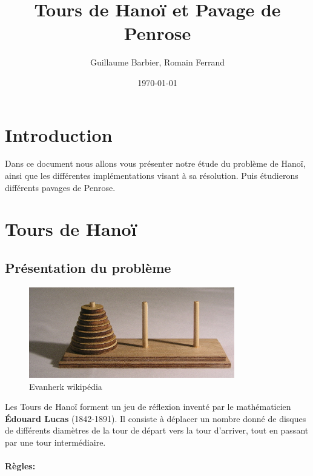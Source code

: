 \documentclass[a4paper,11pt]{article}
\begin{document}
\begin{titlepage}
  \title{Tours de Hanoï et Pavage de Penrose}
  \author{Guillaume Barbier, Romain Ferrand}
  \date{\today}

  \maketitle

  \begin{abstract}
    
  \end{abstract}
\end{titlepage}

\section*{Introduction}
Dans ce document nous allons vous présenter notre étude du problème de Hanoï,
ainsi que les différentes implémentations visant à sa résolution.
Puis étudierons différents pavages de Penrose.

\section{Tours de Hanoï}
\label{chap:hanoi}

\subsection{Présentation du problème}
\label{sec:prezHanoi}
\begin{figure}
  \centering
  \includegraphics[width=0.8\textwidth]{Tower_of_Hanoi.jpeg}
  \caption{Evanherk wikipédia}
  \label{fig:hanoi}
\end{figure}

Les Tours de Hanoï forment un jeu de réflexion inventé par le mathématicien \textbf{Édouard Lucas} (1842-1891).
Il consiste à déplacer un nombre donné de disques de différents diamètres de la tour de départ vers la tour d'arriver, tout en passant par une tour intermédiaire.
\paragraph{Règles:}\mbox{}\\
\end{document}
